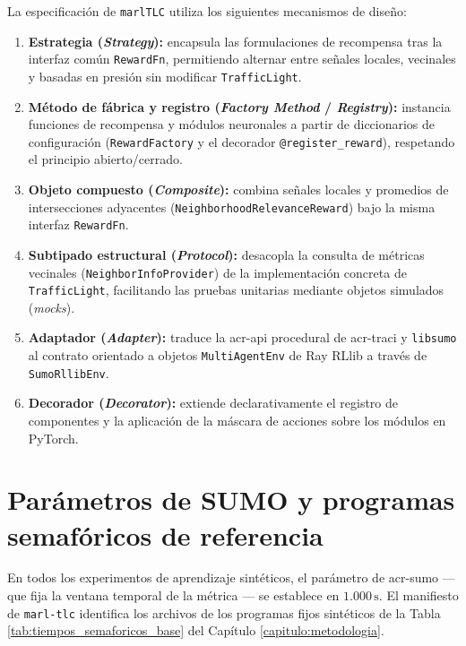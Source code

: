 La especificación de \texttt{marlTLC} utiliza los siguientes mecanismos de diseño:
\begin{enumerate}
    \item \textbf{Estrategia (\textit{Strategy}):} encapsula las formulaciones de recompensa tras la interfaz común \texttt{RewardFn}, permitiendo alternar entre señales locales, vecinales y basadas en presión sin modificar \texttt{TrafficLight}.
    \item \textbf{Método de fábrica y registro (\textit{Factory Method} / \textit{Registry}):} instancia funciones de recompensa y módulos neuronales a partir de diccionarios de configuración (\texttt{RewardFactory} y el decorador \texttt{@register\_reward}), respetando el principio abierto/cerrado.
    \item \textbf{Objeto compuesto (\textit{Composite}):} combina señales locales y promedios de intersecciones adyacentes (\texttt{NeighborhoodRelevanceReward}) bajo la misma interfaz \texttt{RewardFn}.
    \item \textbf{Subtipado estructural (\textit{Protocol}):} desacopla la consulta de métricas vecinales (\texttt{NeighborInfoProvider}) de la implementación concreta de \texttt{TrafficLight}, facilitando las pruebas unitarias mediante objetos simulados (\textit{mocks}).
    \item \textbf{Adaptador (\textit{Adapter}):} traduce la \acrshort{acr-api} procedural de \acrshort{acr-traci} y \texttt{libsumo} al contrato orientado a objetos \texttt{MultiAgentEnv} de Ray RLlib a través de \texttt{SumoRllibEnv}.
    \item \textbf{Decorador (\textit{Decorator}):} extiende declarativamente el registro de componentes y la aplicación de la máscara de acciones sobre los módulos en PyTorch.
\end{enumerate}

\section{Parámetros de SUMO y programas semafóricos de referencia}
\label{sec:parametros_sumo}

En todos los experimentos de aprendizaje sintéticos, el parámetro  de \acrshort{acr-sumo} —que fija la ventana temporal de la métrica  \cite{SUMO2026_TraCIVehicle}— se establece en $1.000\,\text{s}$. El manifiesto  de \texttt{marl-tlc} identifica los archivos de los programas fijos sintéticos de la Tabla \ref{tab:tiempos_semaforicos_base} del Capítulo \ref{capitulo:metodologia}.

